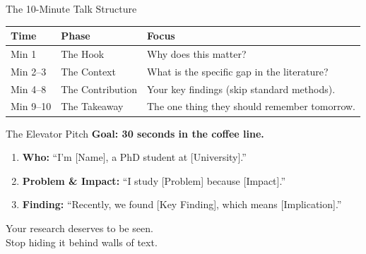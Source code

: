 \documentclass[aspectratio=169]{beamer}
\begin{document}
\begin{frame}{The 10-Minute Talk Structure}
  \begin{table}
  \begin{tabular}{llp{7cm}}
  \toprule
  \textbf{Time} & \textbf{Phase} & \textbf{Focus} \\
  \midrule
  Min 1 & The Hook & Why does this matter? \\
  Min 2--3 & The Context & What is the specific gap in the literature? \\
  Min 4--8 & The Contribution & Your key findings (skip standard methods). \\
  Min 9--10 & The Takeaway & The one thing they should remember tomorrow. \\
  \bottomrule
  \end{tabular}
  \end{table}
\end{frame}

\begin{frame}{The Elevator Pitch}
  \textbf{Goal: 30 seconds in the coffee line.}
  \vspace{0.3cm}
  \begin{enumerate}
    \item \textbf{Who:} ``I'm [Name], a PhD student at [University].''
    \item \textbf{Problem \& Impact:} ``I study [Problem] because [Impact].''
    \item \textbf{Finding:} ``Recently, we found [Key Finding], which means [Implication].''
  \end{enumerate}
\end{frame}

\begin{frame}[standout]
  Your research deserves to be seen.\\
  Stop hiding it behind walls of text.
\end{frame}
\end{document}

